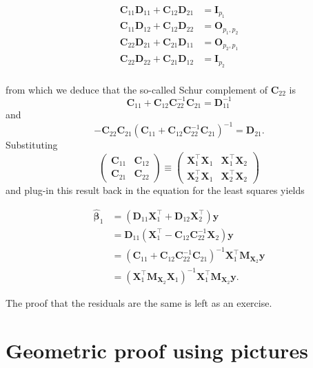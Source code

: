 \documentclass[]{book}
\theoremstyle{definition}
\theoremstyle{definition}
\theoremstyle{definition}
\theoremstyle{remark}
\begin{document}
\begin{align*}
\mathbf{C}_{11}\mathbf{D}_{11}+\mathbf{C}_{12}\mathbf{D}_{21} &= \mathbf{I}_{p_1}\\
\mathbf{C}_{11}\mathbf{D}_{12}+\mathbf{C}_{12}\mathbf{D}_{22} &= \mathbf{O}_{p_1, p_2}\\
\mathbf{C}_{22}\mathbf{D}_{21}+\mathbf{C}_{21}\mathbf{D}_{11} &= \mathbf{O}_{p_2, p_1}\\
\mathbf{C}_{22}\mathbf{D}_{22}+\mathbf{C}_{21}\mathbf{D}_{12} &= \mathbf{I}_{p_2}\\
\end{align*}

from which we deduce that the so-called Schur complement of
\(\mathbf{C}_{22}\) is
\[\mathbf{C}_{11}+\mathbf{C}_{12}\mathbf{C}^{-1}_{22}\mathbf{C}_{21} = \mathbf{D}_{11}^{-1}\]
and \[
-\mathbf{C}_{22}\mathbf{C}_{21}(\mathbf{C}_{11}+\mathbf{C}_{12}\mathbf{C}^{-1}_{22}\mathbf{C}_{21})^{-1} = \mathbf{D}_{21}.
\] Substituting \[
\begin{pmatrix} \mathbf{C}_{11} & \mathbf{C}_{12} \\ \mathbf{C}_{21} &\mathbf{C}_{22}
\end{pmatrix} \equiv \begin{pmatrix} \mathbf{X}_1^\top\mathbf{X}_1 & \mathbf{X}_1^\top\mathbf{X}_2\\\mathbf{X}_2^\top\mathbf{X}_1  &\mathbf{X}_2^\top\mathbf{X}_2 
\end{pmatrix}
\] and plug-in this result back in the equation for the least squares
yields

\begin{align*}
\hat{\boldsymbol{\beta}}_1 &= (\mathbf{D}_{11}\mathbf{X}_1^\top + \mathbf{D}_{12}\mathbf{X}_2^\top)\boldsymbol{y} 
\\&= \mathbf{D}_{11}( \mathbf{X}_1^\top - \mathbf{C}_{12}\mathbf{C}_{22}^{-1}\mathbf{X}_2)\boldsymbol{y}
\\&= \left(\mathbf{C}_{11}+\mathbf{C}_{12}\mathbf{C}^{-1}_{22}\mathbf{C}_{21}\right)^{-1} \mathbf{X}_1^\top\mathbf{M}_{\mathbf{X}_2}\boldsymbol{y} 
\\&= (\mathbf{X}_1^\top\mathbf{M}_{\mathbf{X}_2}\mathbf{X}_1)^{-1}\mathbf{X}_1^\top\mathbf{M}_{\mathbf{X}_2}\boldsymbol{y}.
\end{align*}

The proof that the residuals are the same is left as an exercise.

\section{Geometric proof using
pictures}\label{geometric-proof-using-pictures}
\end{document}
